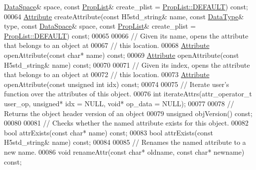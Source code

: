 \begin{DoxyCode}
      \hyperlink{class_h5_1_1_data_space}{DataSpace}& space, \textcolor{keyword}{const} \hyperlink{class_h5_1_1_prop_list}{PropList}& create\_plist = 
      \hyperlink{class_h5_1_1_prop_list_ae52af66ce82af0ea7e6dc57148c56241}{PropList::DEFAULT}) \textcolor{keyword}{const};
00064         \hyperlink{class_h5_1_1_attribute}{Attribute} createAttribute(\textcolor{keyword}{const} H5std\_string& name, \textcolor{keyword}{const} 
      \hyperlink{class_h5_1_1_data_type}{DataType}& type, \textcolor{keyword}{const} \hyperlink{class_h5_1_1_data_space}{DataSpace}& space, \textcolor{keyword}{const} \hyperlink{class_h5_1_1_prop_list}{PropList}& create\_plist = 
      \hyperlink{class_h5_1_1_prop_list_ae52af66ce82af0ea7e6dc57148c56241}{PropList::DEFAULT}) \textcolor{keyword}{const};
00065 
00066         \textcolor{comment}{// Given its name, opens the attribute that belongs to an object at}
00067         \textcolor{comment}{// this location.}
00068         \hyperlink{class_h5_1_1_attribute}{Attribute} openAttribute(\textcolor{keyword}{const} \textcolor{keywordtype}{char}* name) \textcolor{keyword}{const};
00069         \hyperlink{class_h5_1_1_attribute}{Attribute} openAttribute(\textcolor{keyword}{const} H5std\_string& name) \textcolor{keyword}{const};
00070 
00071         \textcolor{comment}{// Given its index, opens the attribute that belongs to an object at}
00072         \textcolor{comment}{// this location.}
00073         \hyperlink{class_h5_1_1_attribute}{Attribute} openAttribute(\textcolor{keyword}{const} \textcolor{keywordtype}{unsigned} \textcolor{keywordtype}{int} idx) \textcolor{keyword}{const};
00074 
00075         \textcolor{comment}{// Iterate user's function over the attributes of this object.}
00076         \textcolor{keywordtype}{int} iterateAttrs(attr\_operator\_t user\_op, \textcolor{keywordtype}{unsigned}* idx = NULL, \textcolor{keywordtype}{void}* op\_data = NULL);
00077 
00078         \textcolor{comment}{// Returns the object header version of an object}
00079         \textcolor{keywordtype}{unsigned} objVersion() \textcolor{keyword}{const};
00080 
00081         \textcolor{comment}{// Checks whether the named attribute exists for this object.}
00082         \textcolor{keywordtype}{bool} attrExists(\textcolor{keyword}{const} \textcolor{keywordtype}{char}* name) \textcolor{keyword}{const};
00083         \textcolor{keywordtype}{bool} attrExists(\textcolor{keyword}{const} H5std\_string& name) \textcolor{keyword}{const};
00084 
00085         \textcolor{comment}{// Renames the named attribute to a new name.}
00086         \textcolor{keywordtype}{void} renameAttr(\textcolor{keyword}{const} \textcolor{keywordtype}{char}* oldname, \textcolor{keyword}{const} \textcolor{keywordtype}{char}* newname) \textcolor{keyword}{const};

\end{DoxyCode}

